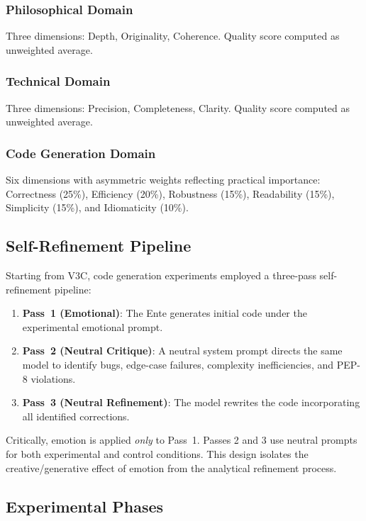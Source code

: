 \documentclass[lineno]{wlpeerj}
\begin{document}
\subsubsection{Philosophical Domain}
Three dimensions: Depth, Originality, Coherence. Quality score computed as unweighted average.

\subsubsection{Technical Domain}
Three dimensions: Precision, Completeness, Clarity. Quality score computed as unweighted average.

\subsubsection{Code Generation Domain}
Six dimensions with asymmetric weights reflecting practical importance: Correctness (25\%), Efficiency (20\%), Robustness (15\%), Readability (15\%), Simplicity (15\%), and Idiomaticity (10\%).

\subsection{Self-Refinement Pipeline}

Starting from V3C, code generation experiments employed a three-pass self-refinement pipeline:

\begin{enumerate}
    \item \textbf{Pass~1 (Emotional)}: The Ente generates initial code under the experimental emotional prompt.
    \item \textbf{Pass~2 (Neutral Critique)}: A neutral system prompt directs the same model to identify bugs, edge-case failures, complexity inefficiencies, and PEP-8 violations.
    \item \textbf{Pass~3 (Neutral Refinement)}: The model rewrites the code incorporating all identified corrections.
\end{enumerate}

Critically, emotion is applied \textit{only} to Pass~1. Passes 2 and 3 use neutral prompts for both experimental and control conditions. This design isolates the creative/generative effect of emotion from the analytical refinement process.

\subsection{Experimental Phases}
\end{document}
